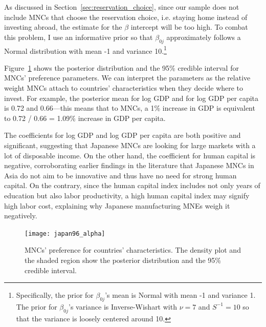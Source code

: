 As discussed in Section~\ref{sec:reservation_choice}, since our sample does not
include MNCs that choose the reservation choice, i.e. staying home instead of
investing abroad, the estimate for the $\beta$ intercept will be too high. To
combat this problem, I use an informative prior so that $\beta_{0j}$
approximately follows a Normal distribution with mean -1 and variance
10.\footnote{Specifically, the prior for $\beta_{0j}$'s mean is Normal with mean
  -1 and variance 1. The prior for $\beta_{0j}$'s variance is Inverse-Wishart
  with $\nu = 7$ and $S^{-1} = 10$ so that the variance is loosely centered
  around 10.}

Figure~\ref{fig:japan96_alpha} shows the posterior distribution and the 95\%
credible interval for MNCs' preference parameters. We can interpret the
parameters as the relative weight MNCs attach to countries' characteristics when
they decide where to invest. For example, the posterior mean for log GDP and for
log GDP per capita is 0.72 and 0.66---this means that to MNCs, a 1\% increase in
GDP is equivalent to 0.72 / 0.66 = 1.09\% increase in GDP per capita.

The coefficients for log GDP and log GDP per capita are both positive and
significant, suggesting that Japanese MNCs are looking for large markets with a
lot of disposable income. On the other hand, the coefficient for human capital
is negative, corroborating earlier findings in the literature that Japanese MNCs
in Asia do not aim to be innovative and thus have no need for strong human
capital. On the contrary, since the human capital index includes not only years
of education but also labor productivity, a high human capital index may signify
high labor cost, explaining why Japanese manufacturing MNEs weigh it negatively.

\begin{figure}[tbp] \centering
  \texttt{[image: japan96\_alpha]}
  \caption[MNCs' preference for countries' characteristics.]{MNCs' preference
    for countries' characteristics. The density plot and the shaded region show
    the posterior distribution and the 95\% credible interval.}
  \label{fig:japan96_alpha}
\end{figure}

